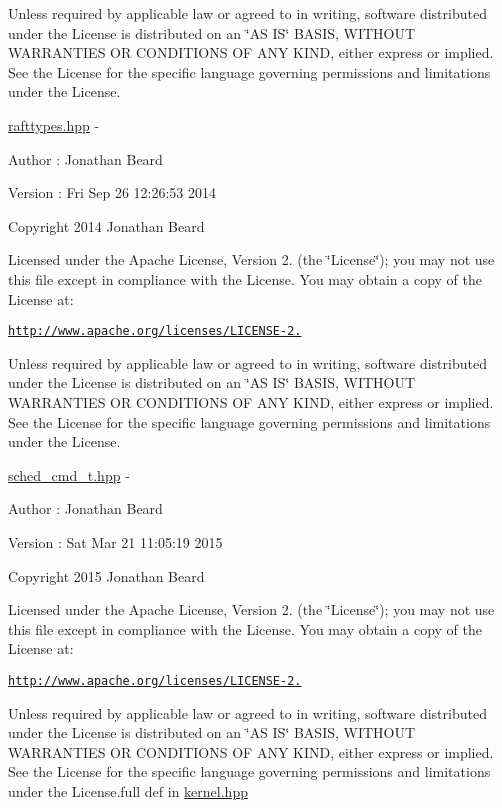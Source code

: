 Unless required by applicable law or agreed to in writing, software distributed under the License is distributed on an \char`\"{}\+A\+S I\+S\char`\"{} B\+A\+S\+IS, W\+I\+T\+H\+O\+UT W\+A\+R\+R\+A\+N\+T\+I\+ES OR C\+O\+N\+D\+I\+T\+I\+O\+NS OF A\+NY K\+I\+ND, either express or implied. See the License for the specific language governing permissions and limitations under the License.

\hyperlink{rafttypes_8hpp_source}{rafttypes.\+hpp} -\/ \begin{DoxyAuthor}{Author}
\+: Jonathan Beard 
\end{DoxyAuthor}
\begin{DoxyVersion}{Version}
\+: Fri Sep 26 12\+:26\+:53 2014
\end{DoxyVersion}
Copyright 2014 Jonathan Beard

Licensed under the Apache License, Version 2. (the \char`\"{}\+License\char`\"{}); you may not use this file except in compliance with the License. You may obtain a copy of the License at\+:

\href{http://www.apache.org/licenses/LICENSE-2.0}{\tt http\+://www.\+apache.\+org/licenses/\+L\+I\+C\+E\+N\+S\+E-\/2.}

Unless required by applicable law or agreed to in writing, software distributed under the License is distributed on an \char`\"{}\+A\+S I\+S\char`\"{} B\+A\+S\+IS, W\+I\+T\+H\+O\+UT W\+A\+R\+R\+A\+N\+T\+I\+ES OR C\+O\+N\+D\+I\+T\+I\+O\+NS OF A\+NY K\+I\+ND, either express or implied. See the License for the specific language governing permissions and limitations under the License.

\hyperlink{sched__cmd__t_8hpp_source}{sched\+\_\+cmd\+\_\+t.\+hpp} -\/ \begin{DoxyAuthor}{Author}
\+: Jonathan Beard 
\end{DoxyAuthor}
\begin{DoxyVersion}{Version}
\+: Sat Mar 21 11\+:05\+:19 2015
\end{DoxyVersion}
Copyright 2015 Jonathan Beard

Licensed under the Apache License, Version 2. (the \char`\"{}\+License\char`\"{}); you may not use this file except in compliance with the License. You may obtain a copy of the License at\+:

\href{http://www.apache.org/licenses/LICENSE-2.0}{\tt http\+://www.\+apache.\+org/licenses/\+L\+I\+C\+E\+N\+S\+E-\/2.}

Unless required by applicable law or agreed to in writing, software distributed under the License is distributed on an \char`\"{}\+A\+S I\+S\char`\"{} B\+A\+S\+IS, W\+I\+T\+H\+O\+UT W\+A\+R\+R\+A\+N\+T\+I\+ES OR C\+O\+N\+D\+I\+T\+I\+O\+NS OF A\+NY K\+I\+ND, either express or implied. See the License for the specific language governing permissions and limitations under the License.\+full def in \hyperlink{kernel_8hpp_source}{kernel.\+hpp}


